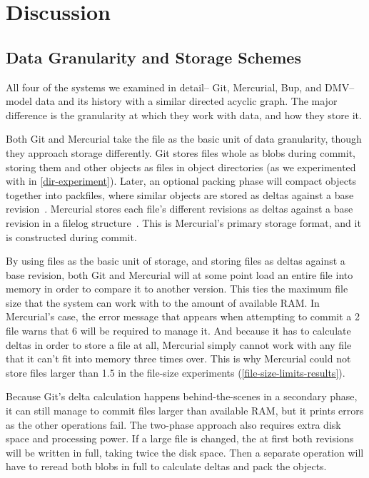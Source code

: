 \chapter{Discussion}


\section{Data Granularity and Storage Schemes}
\label{chunk-then-recombine}

All four of the systems we examined in detail-- Git, Mercurial, Bup, and
\gls{DMV}-- model data and its history with a similar directed acyclic graph.
The major difference is the granularity at which they work with data, and how
they store it.

Both Git and Mercurial take the file as the basic unit of data granularity,
though they approach storage differently. Git stores files whole as \glspl{blob}
during \gls{commit}, storing them and other objects as files in object
directories (as we experimented with in \autoref{dir-experiment}). Later, an
optional packing phase will compact objects together into \glspl{packfile},
where similar objects are stored as deltas against a base revision~\cite[Section
10.4]{git_book}. Mercurial stores each file's different revisions as deltas
   against a base revision in a \gls{filelog} structure~\cite[Chapter
   4]{hgbook}. This is Mercurial's primary storage format, and it is constructed
     during \gls{commit}.

By using files as the basic unit of storage, and storing files as deltas against
a base revision, both Git and Mercurial will at some point load an entire file
into memory in order to compare it to another version. This ties the maximum
file size that the system can work with to the amount of available RAM. In
Mercurial's case, the error message that appears when attempting to \gls{commit}
a \SI{2}{\gib} file warns that \SI{6}{\gib} will be required to manage it. And
because it has to calculate deltas in order to store a file at all, Mercurial
simply cannot work with any file that it can't fit into memory three times over.
This is why Mercurial could not store files larger than \SI{1.5}{\gib} in the
file-size experiments (\autoref{file-size-limits-results}).

Because Git's delta calculation happens behind-the-scenes in a secondary phase,
it can still manage to \gls{commit} files larger than available RAM, but it
prints errors as the other operations fail. The two-phase approach also requires
extra disk space and processing power. If a large file is changed, the at first
both revisions will be written in full, taking twice the disk space. Then a
separate operation will have to reread both \glspl{blob} in full to calculate
deltas and pack the objects.

